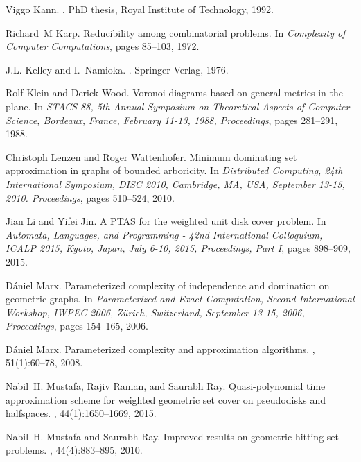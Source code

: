 \documentclass[a4paper,11pt]{article}
\begin{document}
\begin{thebibliography}{10}
Viggo Kann.
.
\newblock PhD thesis, Royal Institute of Technology, 1992.

Richard~M Karp.
\newblock Reducibility among combinatorial problems.
\newblock In {\em Complexity of Computer Computations}, pages 85--103, 1972.

J.L. Kelley and I.~Namioka.
.
\newblock Springer-Verlag, 1976.

Rolf Klein and Derick Wood.
\newblock Voronoi diagrams based on general metrics in the plane.
\newblock In {\em {STACS} 88, 5th Annual Symposium on Theoretical Aspects of
  Computer Science, Bordeaux, France, February 11-13, 1988, Proceedings}, pages
  281--291, 1988.

Christoph Lenzen and Roger Wattenhofer.
\newblock Minimum dominating set approximation in graphs of bounded arboricity.
\newblock In {\em Distributed Computing, 24th International Symposium, {DISC}
  2010, Cambridge, MA, USA, September 13-15, 2010. Proceedings}, pages
  510--524, 2010.

Jian Li and Yifei Jin.
\newblock A {PTAS} for the weighted unit disk cover problem.
\newblock In {\em Automata, Languages, and Programming - 42nd International
  Colloquium, {ICALP} 2015, Kyoto, Japan, July 6-10, 2015, Proceedings, Part
  {I}}, pages 898--909, 2015.

D{\'{a}}niel Marx.
\newblock Parameterized complexity of independence and domination on geometric
  graphs.
\newblock In {\em Parameterized and Exact Computation, Second International
  Workshop, {IWPEC} 2006, Z{\"{u}}rich, Switzerland, September 13-15, 2006,
  Proceedings}, pages 154--165, 2006.

D{\'{a}}niel Marx.
\newblock Parameterized complexity and approximation algorithms.
, 51(1):60--78, 2008.

Nabil~H. Mustafa, Rajiv Raman, and Saurabh Ray.
\newblock Quasi-polynomial time approximation scheme for weighted geometric set
  cover on pseudodisks and halfspaces.
, 44(1):1650--1669, 2015.

Nabil~H. Mustafa and Saurabh Ray.
\newblock Improved results on geometric hitting set problems.
, 44(4):883--895, 2010.


\end{thebibliography}
\end{document}
